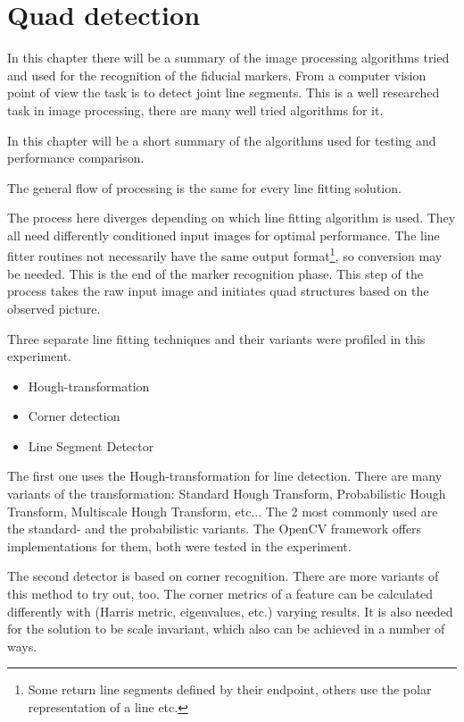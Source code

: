 \chapter{Quad detection}\label{sect:quad_detection}

In this chapter there will be a summary of the image processing algorithms tried and used for the recognition of the fiducial markers.
From a computer vision point of view the task is to detect joint line segments.
This is a well researched task in image processing, there are many well tried algorithms for it.

In this chapter will be a short summary of the algorithms used for testing and performance comparison.


The general flow of processing is the same for every line fitting solution.


The process here diverges depending on which line fitting algorithm is used.
They all need differently conditioned input images for optimal performance.
The line fitter routines not necessarily have the same output format\footnote{Some return line segments defined by their endpoint, others use the polar representation of a line etc.}, so conversion may be needed.
This is the end of the marker recognition phase.
This step of the process takes the raw input image and initiates quad structures based on the observed picture.

Three separate line fitting techniques and their variants were profiled in this experiment.
\begin{itemize}
	\item Hough-transformation
	\item Corner detection
	\item Line Segment Detector\cite{LSDDet}
\end{itemize}
The first one uses the Hough-transformation for line detection.
There are many variants of the transformation: Standard Hough Transform, Probabilistic Hough Transform, Multiscale Hough Transform, etc...
The 2 most commonly used are the standard- and the probabilistic variants.
The OpenCV framework offers implementations for them, both were tested in the experiment.

The second detector is based on corner recognition.
There are more variants of this method to try out, too.
The corner metrics of a feature can be calculated differently with (Harris metric, eigenvalues, etc.) varying results.
It is also needed for the solution to be scale invariant, which also can be achieved in a number of ways.

